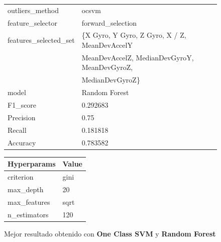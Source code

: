\begin{appendices}
		\begin{figure}[htb]
			\centering
			\begin{tabular}{ll}
				\toprule
					  outliers\_method &                                              ocsvm \\
					 feature\_selector &                                  forward\_selection \\
				features\_selected\_set & \{X Gyro, Y Gyro, Z Gyro, X / Z, MeanDevAccelY\\
										&	MeanDevAccelZ, MedianDevGyroY, MeanDevGyroZ,\\ 
										& MedianDevGyroZ\} \\
								model &                                      Random Forest \\
							 F1\_score &                                           0.292683 \\
							Precision &                                               0.75 \\
							   Recall &                                           0.181818 \\
							 Accuracy &                                           0.783582 \\
				\bottomrule
			\end{tabular}
			\newline
			\newline
			
			\begin{tabular}{ll}
				\toprule
				 Hyperparams & Value \\
				\midrule
				   criterion &  gini \\
				   max\_depth &    20 \\
				max\_features &  sqrt \\
				n\_estimators &   120 \\
				\bottomrule
			\end{tabular}
			\caption{Mejor resultado obtenido con \textbf{One Class SVM} y \textbf{Random Forest}}
			\label{table:33}
		\end{figure}

		
	

\end{appendices}
